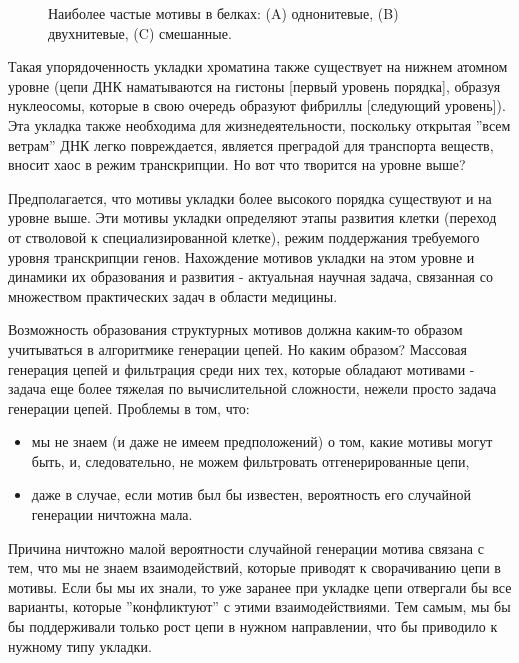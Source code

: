 \documentclass[tikz,a4paper]{scrartcl} %
\begin{document}
\begin{figure}[h]
\caption{Наиболее частые мотивы в белках: (A) однонитевые, (B) двухнитевые, (C) смешанные.}
\label{pic:motifs}
\end{figure}

Такая упорядоченность укладки хроматина также существует на нижнем атомном уровне (цепи ДНК наматываются на гистоны [первый уровень порядка], образуя нуклеосомы, которые в свою очередь образуют фибриллы [следующий уровень]). Эта укладка также необходима для жизнедеятельности, поскольку открытая ''всем ветрам'' ДНК легко повреждается, является преградой для транспорта веществ, вносит хаос в режим транскрипции. Но вот что творится на уровне выше? 

Предполагается, что мотивы укладки более высокого порядка существуют и на уровне выше. Эти мотивы укладки определяют этапы развития клетки (переход от стволовой к специализированной клетке), режим поддержания требуемого уровня транскрипции генов. Нахождение мотивов укладки на этом уровне и динамики их образования и развития - актуальная научная задача, связанная со множеством практических задач в области медицины.

Возможность образования структурных мотивов должна каким-то образом учитываться в алгоритмике генерации цепей. Но каким образом? Массовая генерация цепей и фильтрация среди них тех, которые обладают мотивами - задача еще более тяжелая по вычислительной сложности, нежели просто задача генерации цепей. Проблемы в том, что:
\begin{itemize}
\item мы не знаем (и даже не имеем предположений) о том, какие мотивы могут быть, и, следовательно, не можем фильтровать отгенерированные цепи,
\item даже в случае, если мотив был бы известен, вероятность его случайной генерации ничтожна мала.
\end{itemize} 
Причина ничтожно малой вероятности случайной генерации мотива связана с тем, что мы не знаем взаимодействий, которые приводят к сворачиванию цепи в мотивы. Если бы мы их знали, то уже заранее при укладке цепи отвергали бы все варианты, которые ''конфликтуют'' с этими взаимодействиями. Тем самым, мы бы бы поддерживали только  рост цепи в нужном направлении, что бы приводило к нужному типу укладки.
\end{document}
